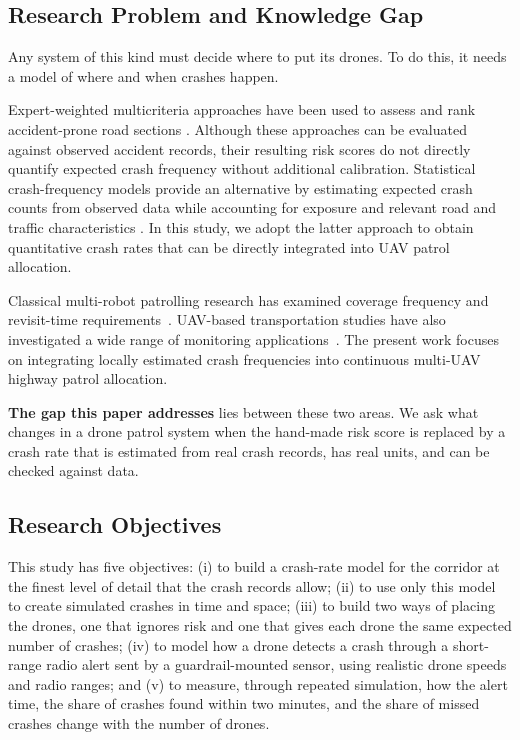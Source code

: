 \documentclass[11pt]{article}
\begin{document}
\subsection{Research Problem and Knowledge Gap}

Any system of this kind must decide where to put its drones. To do this, it
needs a model of where and when crashes happen.

Expert-weighted multicriteria approaches have been used to assess and rank accident-prone road sections \cite{yakar2021}.
Although these approaches can be evaluated against observed accident records, their resulting risk scores do not directly quantify expected crash frequency without additional calibration. Statistical crash-frequency models provide an alternative by estimating expected crash counts from observed data while accounting for exposure and relevant road and traffic characteristics \cite{lordmannering2010}.
In this study, we adopt the latter approach to obtain quantitative crash rates that can be directly integrated into UAV patrol allocation.

Classical multi-robot patrolling research has examined coverage frequency
and revisit-time requirements~\cite{elmaliach2009,portugal2011}.
UAV-based transportation studies have also investigated a wide range of
monitoring applications~\cite{outay2020,menouar2017}.
The present work focuses on integrating locally estimated crash frequencies
into continuous multi-UAV highway patrol allocation.

\textbf{The gap this paper addresses} lies between these two areas. We ask what
changes in a drone patrol system when the hand-made risk score is replaced by a
crash rate that is estimated from real crash records, has real units, and can
be checked against data.

\subsection{Research Objectives}

This study has five objectives: (i) to build a crash-rate model for the
corridor at the finest level of detail that the crash records allow; (ii) to
use only this model to create simulated crashes in time and space; (iii) to
build two ways of placing the drones, one that ignores risk and one that gives
each drone the same expected number of crashes; (iv) to model how a drone
detects a crash through a short-range radio alert sent by a guardrail-mounted
sensor, using realistic drone speeds and radio ranges; and (v) to measure,
through repeated simulation, how the alert time, the share of crashes found
within two minutes, and the share of missed crashes change with the number of
drones.
\end{document}
